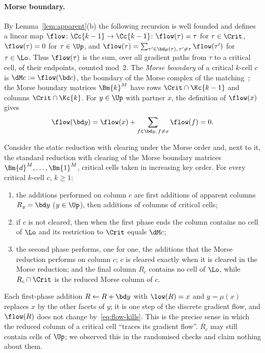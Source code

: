 \paragraph{Morse boundary.} By Lemma~\ref{lem:apparent}(b) the following
recursion is well founded and defines a linear map
$\flow\colon\Cc{k-1}\to\Cc{k-1}$: $\flow(\tau)=\tau$ for $\tau\in\Crit$,
$\flow(\tau)=0$ for $\tau\in\Up$, and
$\flow(\tau)=\sum_{\tau'\in\bd\mu(\tau),\,\tau'\ne\tau}\flow(\tau')$ for
$\tau\in\Lo$. Thus $\flow(\tau)$ is the sum, over all gradient paths from $\tau$
to a critical cell, of their endpoints, counted mod~2. The \emph{Morse boundary}
of a critical $k$-cell $c$ is $\dM c:=\flow(\bd c)$, the boundary of the Morse
complex of the matching~\cite{forman2002user}; the Morse boundary matrices
$\Bm{k}^M$ have rows $\Crit\cap\Kc{k-1}$ and columns $\Crit\cap\Kc{k}$. For
$y\in\Up$ with partner $x$, the definition of $\flow(x)$ gives
\begin{equation}\label{eq:flow-kills}
  \flow(\bd y)=\flow(x)+\sum_{f\in\bd y,\,f\ne x}\flow(f)=0 .
\end{equation}

\begin{corollary}\label{cor:morse-reduction}
Consider the static reduction with clearing under the Morse order and, next to
it, the standard reduction with clearing of the Morse boundary matrices
$\Bm{d}^M,\dots,\Bm{1}^M$, critical cells taken in increasing key order. For
every critical $k$-cell $c$, $k\ge1$:
\begin{enumerate}
\item[(i)] the additions performed on column $c$ are first additions of apparent
  columns $R_y=\bd y$ ($y\in\Up$), then additions of columns of critical cells;
\item[(ii)] if $c$ is not cleared, then when the first phase ends the column
  contains no cell of $\Lo$ and its restriction to $\Crit$ equals $\dM c$;
\item[(iii)] the second phase performs, one for one, the additions that the
  Morse reduction performs on column $c$; $c$ is cleared exactly when it is
  cleared in the Morse reduction; and the final column $R_c$ contains no cell
  of $\Lo$, while $R_c\cap\Crit$ is the reduced Morse column of $c$.
\end{enumerate}
\end{corollary}

Each first-phase addition $R\gets R+\bd y$ with $\low(R)=x$ and $y=\mu(x)$
replaces $x$ by the other facets of $y$; it is one step of the discrete gradient
flow, and $\flow(R)$ does not change by~\eqref{eq:flow-kills}. This is the
precise sense in which the reduced column of a critical cell ``traces its
gradient flow''. $R_c$ may still contain cells of $\Up$; we observed this in
the randomised checks and claim nothing about them.

